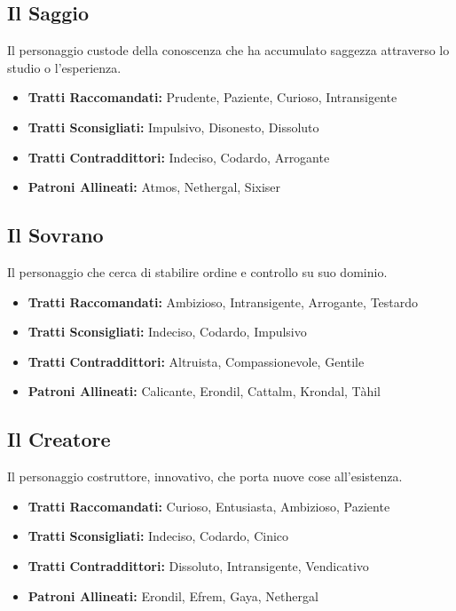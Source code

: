\begin{multicols}{2}
\subsection*{Il Saggio}
Il personaggio custode della conoscenza che ha accumulato saggezza attraverso lo studio o l'esperienza.

\noindent\begin{itemize}[leftmargin=*] \setlength{\itemsep}{0pt}
\item \textbf{Tratti Raccomandati:} Prudente, Paziente, Curioso, Intransigente
\item \textbf{Tratti Sconsigliati:} Impulsivo, Disonesto, Dissoluto
\item \textbf{Tratti Contraddittori:} Indeciso, Codardo, Arrogante
\item \textbf{Patroni Allineati:} Atmos, Nethergal, Sixiser
\end{itemize}

\subsection*{Il Sovrano}
Il personaggio che cerca di stabilire ordine e controllo su suo dominio.

\noindent\begin{itemize}[leftmargin=*] \setlength{\itemsep}{0pt}
\item \textbf{Tratti Raccomandati:} Ambizioso, Intransigente, Arrogante, Testardo
\item \textbf{Tratti Sconsigliati:} Indeciso, Codardo, Impulsivo
\item \textbf{Tratti Contraddittori:} Altruista, Compassionevole, Gentile
\item \textbf{Patroni Allineati:} Calicante, Erondil, Cattalm, Krondal, Tàhil
\end{itemize}

\subsection*{Il Creatore}
Il personaggio costruttore, innovativo, che porta nuove cose all'esistenza.

\noindent\begin{itemize}[leftmargin=*] \setlength{\itemsep}{0pt}
\item \textbf{Tratti Raccomandati:} Curioso, Entusiasta, Ambizioso, Paziente
\item \textbf{Tratti Sconsigliati:} Indeciso, Codardo, Cinico
\item \textbf{Tratti Contraddittori:} Dissoluto, Intransigente, Vendicativo
\item \textbf{Patroni Allineati:} Erondil, Efrem, Gaya, Nethergal
\end{itemize}


\end{multicols}
